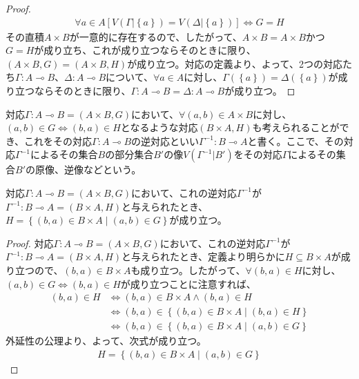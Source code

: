 \documentclass[a4paper]{jsarticle}
\begin{document}
\begin{proof}
\begin{align*}
\forall a \in A\left[ V\left( \varGamma|\left\{ a \right\} \right) = V\left( \varDelta|\left\{ a \right\} \right) \right] \Leftrightarrow G = H
\end{align*}
その直積$A \times B$が一意的に存在するので、したがって、$A \times B = A \times B$かつ$G = H$が成り立ち、これが成り立つならそのときに限り、$(A \times B,G) = (A \times B,H)$が成り立つ。対応の定義より、よって、2つの対応たち$\varGamma:A \multimap B$、$\varDelta:A \multimap B$について、$\forall a \in A$に対し、$\varGamma\left( \left\{ a \right\} \right) = \varDelta\left( \left\{ a \right\} \right)$が成り立つならそのときに限り、$\varGamma:A \multimap B = \varDelta:A \multimap B$が成り立つ。
\end{proof}
\begin{dfn}
対応$\varGamma:A \multimap B = (A \times B,G)$において、$\forall(a,b) \in A \times B$に対し、$(a,b) \in G \Leftrightarrow (b,a) \in H$となるような対応$(B \times A,H)$も考えられることができ、これをその対応$\varGamma:A \multimap B$の逆対応といい$\varGamma^{- 1}:B \multimap A$と書く。ここで、その対応$\varGamma^{- 1}$によるその集合$B$の部分集合$B'$の像$V\left( \varGamma^{- 1}|B' \right)$をその対応$\varGamma$によるその集合$B'$の原像、逆像などという。
\end{dfn}
\begin{thm}
\label{1.2.1.18}
対応$\varGamma:A \multimap B = (A \times B,G)$において、これの逆対応$\varGamma^{- 1}$が$\varGamma^{- 1}:B \multimap A = (B \times A,H)$と与えられたとき、$H = \left\{ (b,a) \in B \times A \middle| (a,b) \in G \right\}$が成り立つ。
\end{thm}
\begin{proof}
対応$\varGamma:A \multimap B = (A \times B,G)$において、これの逆対応$\varGamma^{- 1}$が$\varGamma^{- 1}:B \multimap A = (B \times A,H)$と与えられたとき、定義より明らかに$H \subseteq B \times A$が成り立つので、$(b,a) \in B \times A$も成り立つ。したがって、$\forall(b,a) \in H$に対し、$(a,b) \in G \Leftrightarrow (b,a) \in H$が成り立つことに注意すれば、
\begin{align*}
(b,a) \in H &\Leftrightarrow (b,a) \in B \times A \land (b,a) \in H\\
&\Leftrightarrow (b,a) \in \left\{ (b,a) \in B \times A \middle| (b,a) \in H \right\}\\
&\Leftrightarrow (b,a) \in \left\{ (b,a) \in B \times A \middle| (a,b) \in G \right\}
\end{align*}
外延性の公理より、よって、次式が成り立つ。
\begin{align*}
H = \left\{ (b,a) \in B \times A \middle| (a,b) \in G \right\}
\end{align*}
\end{proof}
\end{document}
